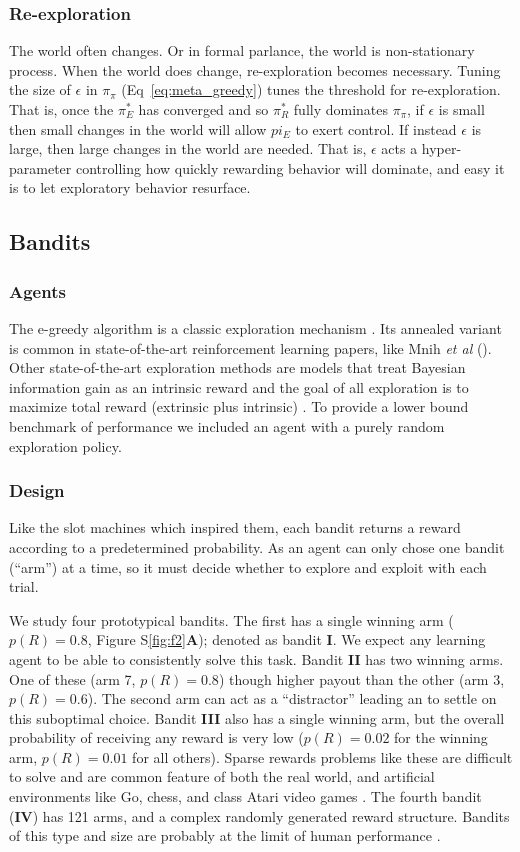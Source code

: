 \subsubsection*{Re-exploration}
The world often changes. Or in formal parlance, the world is non-stationary process. When the world does change, re-exploration becomes necessary. Tuning the size of $\epsilon$ in $\pi_{\pi}$ (Eq~\ref{eq:meta_greedy}) tunes the threshold for re-exploration. That is, once the $\pi^*_E$ has converged and so $\pi^*_R$ fully dominates $\pi_{\pi}$, if $\epsilon$ is small then small changes in the world will allow $pi_E$ to exert control. If instead $\epsilon$ is large, then large changes in the world are needed. That is, $\epsilon$ acts a hyper-parameter controlling how quickly rewarding behavior will dominate, and easy it is to let exploratory behavior resurface.

\subsection*{Bandits}
\subsubsection*{Agents} The e-greedy algorithm is a classic exploration mechanism \cite{Sutton2018}. Its annealed variant is common in state-of-the-art reinforcement learning papers, like Mnih \emph{et al} (\cite{Mniha}). Other state-of-the-art exploration methods are models that treat Bayesian information gain as an intrinsic reward and the goal of all exploration is to maximize total reward (extrinsic plus intrinsic) \cite{Jaegle2019,Schmidhuber1991}. To provide a lower bound benchmark of performance we included an agent with a purely random exploration policy.

\subsubsection*{Design} Like the slot machines which inspired them, each bandit returns a reward according to a predetermined probability. As an agent can only chose one bandit (``arm'') at a time, so it must decide whether to explore and exploit with each trial.

We study four prototypical bandits. The first has a single winning arm ($p(R) = 0.8$, Figure S\ref{fig:f2}\textbf{A}); denoted as bandit \textbf{I}. We expect any learning agent to be able to consistently solve this task. Bandit \textbf{II} has two winning arms. One of these (arm 7, $p(R) = 0.8$) though higher payout than the other (arm 3, $p(R) = 0.6$). The second arm can act as a ``distractor'' leading an to settle on this suboptimal choice. Bandit \textbf{III} also has a single winning arm, but the overall probability of receiving any reward is very low ($p(R) = 0.02$ for the winning arm, $p(R) = 0.01$ for all others). Sparse rewards problems like these are difficult to solve and are common feature of both the real world, and artificial environments like Go, chess, and class Atari video games \cite{Mniha,Silver2016b,Silver2018}. The fourth bandit (\textbf{IV}) has 121 arms, and a complex randomly generated reward structure. Bandits of this type and size are probably at the limit of human performance \cite{Wu2018}. 

